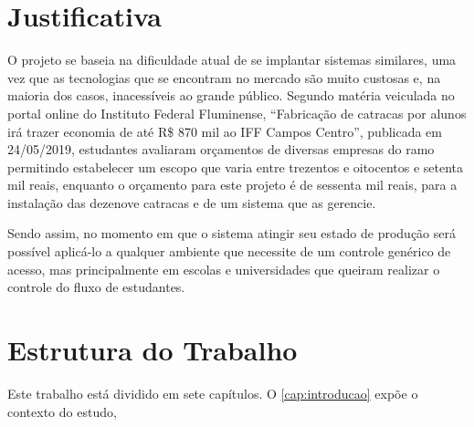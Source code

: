 \section{Justificativa}

O projeto se baseia na dificuldade atual de se implantar sistemas similares,
uma vez que as tecnologias que se encontram no mercado são muito custosas e,
na maioria dos casos, inacessíveis ao grande público. Segundo matéria veiculada
no portal online do Instituto Federal Fluminense, “Fabricação de catracas por
alunos irá trazer economia de até R\$ 870 mil ao IFF Campos Centro”, publicada
em 24/05/2019, estudantes avaliaram orçamentos de diversas empresas do ramo permitindo
estabelecer um escopo que varia entre trezentos e oitocentos e setenta mil reais,
enquanto o orçamento para este projeto é de sessenta mil reais, para a instalação
das dezenove catracas e de um sistema que as gerencie.


Sendo assim, no momento em que o sistema atingir seu estado de produção será possível
aplicá-lo a qualquer ambiente que necessite de um controle genérico de acesso, mas
principalmente em escolas e universidades que queiram realizar o
controle do fluxo de estudantes.


\section{Estrutura do Trabalho}
Este trabalho está dividido em sete capítulos.
O \autoref{cap:introducao} expõe o contexto do estudo,
